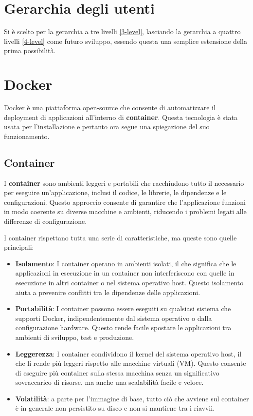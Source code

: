 \section{Gerarchia degli utenti}
Si è scelto per la gerarchia a tre livelli \ref{3-level}, lasciando la gerarchia a quattro livelli \ref{4-level} come futuro sviluppo, essendo questa una semplice estensione della prima possibilità.

\section{Docker}
\label{docker}
Docker è una piattaforma open-source che consente di automatizzare il deployment di applicazioni all'interno di \textbf{container}. Questa tecnologia è stata usata per l'installazione e pertanto ora segue una spiegazione del suo funzionamento.

\subsection{Container}
I \textbf{container} sono ambienti leggeri e portabili che racchiudono tutto il necessario per eseguire un'applicazione, inclusi il codice, le librerie, le dipendenze e le configurazioni. Questo approccio consente di garantire che l'applicazione funzioni in modo coerente su diverse macchine e ambienti, riducendo i problemi legati alle differenze di configurazione.

I container rispettano tutta una serie di caratteristiche, ma queste sono quelle principali:
\begin{itemize}
    \item \textbf{Isolamento}: I container operano in ambienti isolati, il che significa che le applicazioni in esecuzione in un container non interferiscono con quelle in esecuzione in altri container o nel sistema operativo host. Questo isolamento aiuta a prevenire conflitti tra le dipendenze delle applicazioni.
    \item \textbf{Portabilità}: I container possono essere eseguiti su qualsiasi sistema che supporti Docker, indipendentemente dal sistema operativo o dalla configurazione hardware. Questo rende facile spostare le applicazioni tra ambienti di sviluppo, test e produzione.
    \item \textbf{Leggerezza}: I container condividono il kernel del sistema operativo host, il che li rende più leggeri rispetto alle macchine virtuali (VM). Questo consente di eseguire più container sulla stessa macchina senza un significativo sovraccarico di risorse, ma anche una scalabilità facile e veloce.
    \item \textbf{Volatilità}: a parte per l'immagine di base, tutto ciò che avviene sul container è in generale non persistito su disco e non si mantiene tra i riavvii.
\end{itemize}

